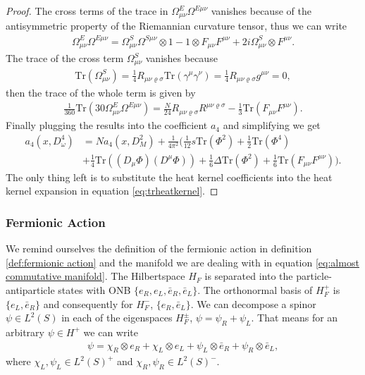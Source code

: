 \begin{proof}
     The cross terms of the trace in $\Omega_{\mu\nu}^E\Omega^{E\mu\nu}$
     vanishes because of the antisymmetric property of the Riemannian
     curvature tensor, thus we can write
     \begin{align}
         \Omega_{\mu\nu}^E\Omega^{E\mu\nu} = \Omega_{\mu\nu}^S\Omega^{S\mu\nu}
         \otimes 1 - 1\otimes F_{\mu\nu}F^{\mu\nu} + 2i\Omega_{\mu\nu}^S
         \otimes F^{\mu\nu}.
     \end{align}
     The trace  of the cross term $\Omega^{S}_{\mu\nu}$ vanishes because
     \begin{align}
         \text{Tr}(\Omega^{S}_{\mu\nu}) = \frac{1}{4}
         R_{\mu\nu\varrho\sigma}\text{Tr}(\gamma^\mu\gamma^\nu) = \frac{1}{4}
         R_{\mu\nu\varrho\sigma}g^{\mu\nu} =0,
     \end{align}
     then the trace of the whole term is given by
     \begin{align}
         \frac{1}{360}\text{Tr}(30\Omega^E_{\mu\nu}\Omega^{E\mu\nu}) =
         \frac{N}{24}R_{\mu\nu\varrho\sigma}R^{\mu\nu\varrho\sigma}
         -\frac{1}{3}\text{Tr}(F_{\mu\nu}F^{\mu\nu}).
     \end{align}
     Finally plugging the results into the coefficient $a_4$ and simplifying we get
     \begin{align}
         a_4(x, D_\omega^4) &= Na_4(x, D_M^2) + \frac{1}{4\pi^2}\bigg(\frac{1}{12} s
         \text{Tr}(\Phi^2) + \frac{1}{2}\text{Tr}(\Phi^4) \nonumber \\
         &+ \frac{1}{4}
         \text{Tr}((D_\mu\Phi)(D^\mu \Phi)) + \frac{1}{6}
         \Delta\text{Tr}(\Phi^2) + \frac{1}{6}
         \text{Tr}(F_{\mu\nu}F^{\mu\nu})\bigg).
     \end{align}
     The only thing left is to substitute the heat kernel coefficients into the
     heat kernel expansion in equation \eqref{eq:trheatkernel}.
\end{proof}

\subsubsection{Fermionic Action}
We remind ourselves the definition of the fermionic action in definition
\ref{def:fermionic action} and the manifold we are dealing with in equation
\eqref{eq:almost commutative manifold}. The Hilbertspace $H_F$ is separated
into the particle-antiparticle states with ONB $\{e_R, e_L, \bar{e}_R,
\bar{e}_L\}$. The orthonormal basis of $H_F^+$ is $\{e_L, \bar{e}_R\}$ and
consequently for $H_F^-$, $\{e_R, \bar{e}_L\}$. We can decompose a spinor
$\psi \in L^2(S)$ in each of the eigenspaces $H_F^\pm$, $\psi = \psi_R+
\psi_L$. That means for an arbitrary $\psi \in H^+$ we can write
\begin{align}
    \psi = \chi_R \otimes e_R + \chi_L \otimes e_L + \psi_L \otimes
    \bar{e}_R+
    \psi_R \otimes \bar{e}_L,
\end{align}
where $\chi_L, \psi_L \in L^2(S)^+$ and $\chi_R, \psi_R \in L^2(S)^-$.

